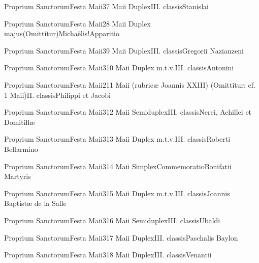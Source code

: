 \documentclass[psalterium-feriale.tex]{subfiles}
\begin{document}
	{Proprium Sanctorum}{Festa Maii}{3}{7 Maii}
	{Duplex}{III. classis}{Stanislai}
	{}
	{}
\UMTPRubric

	{Proprium Sanctorum}{Festa Maii}{2}{8 Maii}
	{Duplex majus}{(Omittitur)}{Michaëlis!Apparitio}
	{}
	{}
\psalmodiapropria

	{Proprium Sanctorum}{Festa Maii}{3}{9 Maii}
	{Duplex}{III. classis}{Gregorii Nazianzeni} %
	{}
	{}
\COPOdRubric

	{Proprium Sanctorum}{Festa Maii}{3}{10 Maii}
	{Duplex m.t.v.}{III. classis}{Antonini}
	{}
	{}
\COPOdRubric

	{Proprium Sanctorum}{Festa Maii}{2}{11 Maii (rubricæ Joannis XXIII)}
	{(Omittitur: cf. 1 Maii)}{II. classis}{Philippi et Jacobi}
	{}
	{}
\psalmodiapropria

	{Proprium Sanctorum}{Festa Maii}{3}{12 Maii}
	{Semiduplex}{III. classis}{Nerei, Achillei et Domitillæ}
	{}
	{}
\PMTPRubric

	{Proprium Sanctorum}{Festa Maii}{3}{13 Maii}
	{Duplex m.t.v.}{III. classis}{Roberti Bellarmino}
	{}
	{}
\COPOdRubric

	{Proprium Sanctorum}{Festa Maii}{3}{14 Maii}
	{Simplex}{Commemoratio}{Bonifatii Martyris}
	{}
	{}
\UMTPRubric

	{Proprium Sanctorum}{Festa Maii}{3}{15 Maii}
	{Duplex m.t.v.}{III. classis}{Joannis Baptistæ de la Salle}
	{}
	{}
\COPOdRubric

	{Proprium Sanctorum}{Festa Maii}{3}{16 Maii}
	{Semiduplex}{III. classis}{Ubaldi}
	{}
	{}
\COPOdRubric

	{Proprium Sanctorum}{Festa Maii}{3}{17 Maii}
	{Duplex}{III. classis}{Paschalis Baylon}
	{}
	{}
\COPOdRubric

	{Proprium Sanctorum}{Festa Maii}{3}{18 Maii}
	{Duplex}{III. classis}{Venantii}
	{}
	{}
\end{document}
